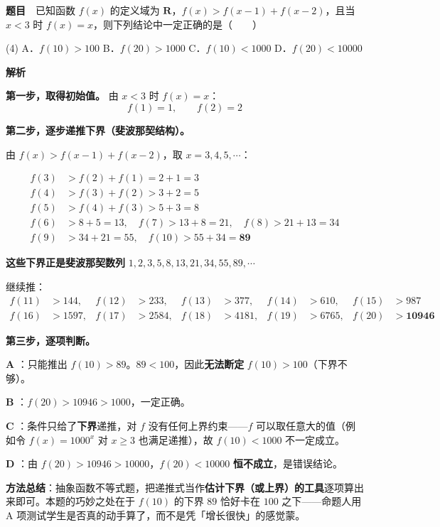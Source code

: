 \par\medskip


\textbf{题目}　已知函数 $f(x)$ 的定义域为 $\mathbf R$，$f(x)>f(x-1)+f(x-2)$，且当 $x<3$ 时 $f(x)=x$，则下列结论中一定正确的是（　　）

\begin{gkopts}(4)
\task A．$f(10)>100$
\task B．$f(20)>1000$
\task C．$f(10)<1000$
\task D．$f(20)<10000$
\end{gkopts}

\textbf{解析}

\textbf{第一步，取得初始值。} 由 $x<3$ 时 $f(x)=x$：
\[f(1)=1,\qquad f(2)=2\]

\textbf{第二步，逐步递推下界（斐波那契结构）。}

由 $f(x)>f(x-1)+f(x-2)$，取 $x=3,4,5,\cdots$：

\[\begin{aligned}
f(3)&>f(2)+f(1)=2+1=3\\
f(4)&>f(3)+f(2)>3+2=5\\
f(5)&>f(4)+f(3)>5+3=8\\
f(6)&>8+5=13,\quad f(7)>13+8=21,\quad f(8)>21+13=34\\
f(9)&>34+21=55,\quad f(10)>55+34=\mathbf{89}
\end{aligned}\]

\textbf{这些下界正是斐波那契数列} $1,2,3,5,8,13,21,34,55,89,\cdots$

继续推：
\[\begin{aligned}
f(11)&>144,& f(12)&>233,& f(13)&>377,& f(14)&>610,& f(15)&>987\\
f(16)&>1597,& f(17)&>2584,& f(18)&>4181,& f(19)&>6765,& f(20)&>\mathbf{10946}
\end{aligned}\]

\textbf{第三步，逐项判断。}

\textbf{A }：只能推出 $f(10)>89$。$89<100$，因此\textbf{无法断定} $f(10)>100$（下界不够）。

\textbf{B }：$f(20)>10946>1000$，一定正确。

\textbf{C }：条件只给了\textbf{下界}递推，对 $f$ 没有任何上界约束——$f$ 可以取任意大的值（例如令 $f(x)=1000^{x}$ 对 $x\ge3$ 也满足递推），故 $f(10)<1000$ 不一定成立。

\textbf{D }：由 $f(20)>10946>10000$，$f(20)<10000$ \textbf{恒不成立}，是错误结论。


\begin{gktip}
\textbf{方法总结}：抽象函数不等式题，把递推式当作\textbf{估计下界（或上界）的工具}逐项算出来即可。本题的巧妙之处在于 $f(10)$ 的下界 $89$ 恰好卡在 $100$ 之下——命题人用 A 项测试学生是否真的动手算了，而不是凭「增长很快」的感觉蒙。
\end{gktip}

